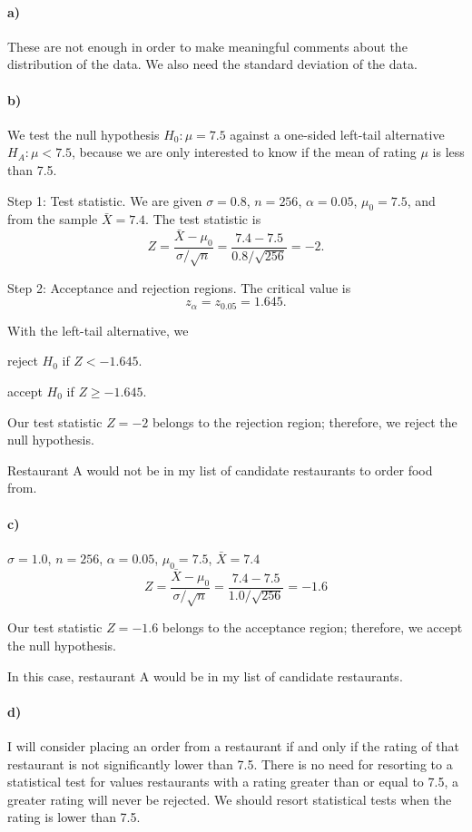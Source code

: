 \documentclass[12pt]{article}
\begin{document}
\paragraph{a)}
These are not enough in order to make meaningful comments about the distribution of the data. We also need the standard deviation of the data.
\paragraph{b)}
We test the null hypothesis $H_0: \mu = 7.5$ against a one-sided left-tail alternative $H_A: \mu < 7.5$, because we are only interested to know if the mean of rating $\mu$ is less than 7.5.

Step 1: Test statistic. We are given $\sigma = 0.8$, $n = 256$, $\alpha = 0.05$, $\mu_0 = 7.5$, and from the sample $\bar{X}=7.4$. The test statistic is
\[
    Z = \frac{\bar{X} - \mu_0}{\sigma/\sqrt{n}} = \frac{7.4 - 7.5}{0.8/\sqrt{256}} = -2.
\]

Step 2: Acceptance and rejection regions. The critical value is
\[
    z_\alpha = z_{0.05} = 1.645.
\]

With the left-tail alternative, we
\begin{center}
    reject $H_0$ if $Z < -1.645$.

    accept $H_0$ if $Z \geq -1.645$.
\end{center}

Our test statistic $Z = -2$ belongs to the rejection region; therefore, we reject the null hypothesis.

Restaurant A would not be in my list of candidate restaurants to order food from.
\paragraph{c)}
$\sigma = 1.0$, $n = 256$, $\alpha = 0.05$, $\mu_0 = 7.5$, $\bar{X}=7.4$
\[
    Z = \frac{\bar{X} - \mu_0}{\sigma/\sqrt{n}} = \frac{7.4 - 7.5}{1.0/\sqrt{256}} = -1.6
\]

Our test statistic $Z = -1.6$ belongs to the acceptance region; therefore, we accept the null hypothesis.

In this case, restaurant A would be in my list of candidate restaurants.
\paragraph{d)}
I will consider placing an order from a restaurant if and only if the rating of that restaurant is not significantly lower than 7.5. There is no need for resorting to a statistical test for values restaurants with a rating greater than or equal to 7.5, a greater rating will never be rejected. We should resort statistical tests when the rating is lower than 7.5.
\newpage
\end{document}

